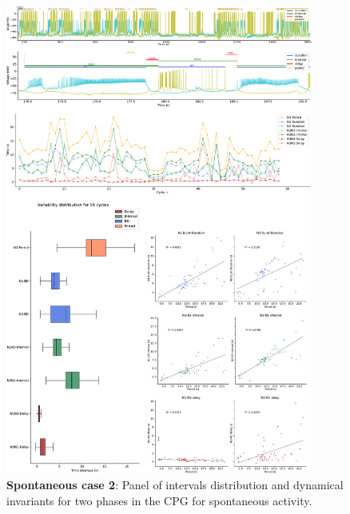 \begin{figure}[htbp]
	\centering
	\includegraphics[width=0.9\textwidth]{./invariants/data/SUSSEX/prep3/images/2phases/panel_with_intervals.pdf}
	\caption{\textbf{Spontaneous case 2}: Panel of intervals distribution and dynamical invariants for two phases in the CPG for spontaneous activity.}
	\label{fig:prep3 2phases invariants}
\end{figure}

